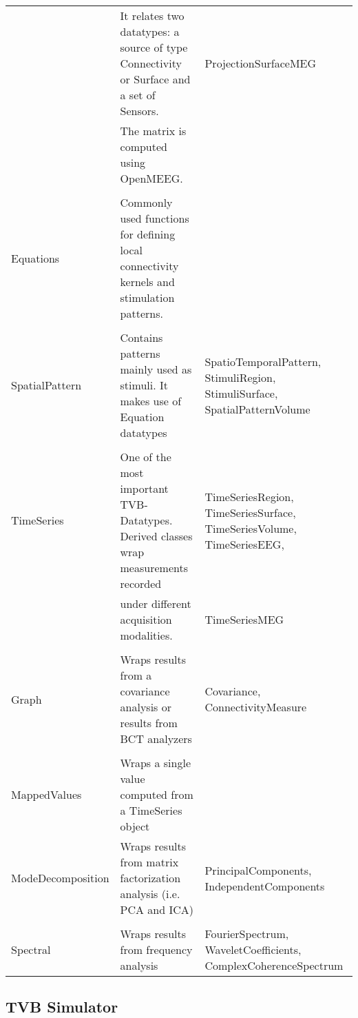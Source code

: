 \documentclass{bioinfo}
\begin{document}
\begin{methods}
\begin{center}
\begin{table*}[ht]
\begin{tabularx}{\textwidth}{lll}
                              & It relates two datatypes: a source of type
Connectivity or Surface and a set of Sensors.
& ProjectionSurfaceMEG \\                               & The matrix is
computed using OpenMEEG. \citep{Gramfort_2010} & \\             \\
Equations           & Commonly used functions for defining local connectivity
kernels and stimulation patterns. &    \\             \\
SpatialPattern      & Contains patterns mainly used as stimuli. It makes use
of Equation datatypes
& SpatioTemporalPattern,
StimuliRegion,
StimuliSurface,
SpatialPatternVolume \\             \\
TimeSeries          & One of the most important TVB-Datatypes. Derived classes
wrap measurements recorded  & TimeSeriesRegion,
TimeSeriesSurface,
TimeSeriesVolume,
TimeSeriesEEG, \\                              & under different acquisition
modalities.                           &   TimeSeriesMEG \\             \\
Graph               & Wraps results from a covariance analysis or results from
BCT analyzers    &   Covariance,
ConnectivityMeasure\\             \\
MappedValues      & Wraps a single value computed from a TimeSeries object &
\\             ModeDecomposition & Wraps results from matrix factorization
analysis (i.e. PCA and ICA) &   PrincipalComponents,
IndependentComponents\\             \\
Spectral            & Wraps results from frequency analysis         &
FourierSpectrum, WaveletCoefficients, ComplexCoherenceSpectrum \\
\bottomrule         \end{tabularx}     \end{table*} \end{center}



    \subsection{TVB Simulator}
    

\end{methods}
\end{document}

